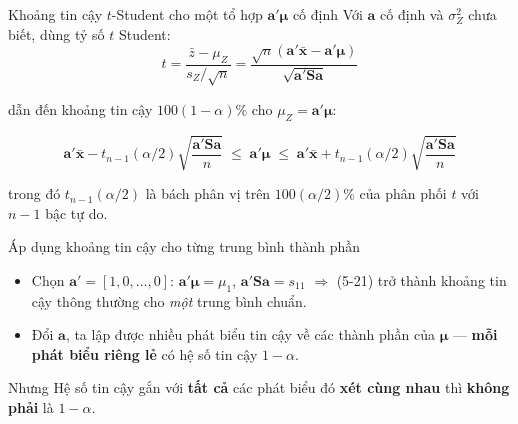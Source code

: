 \begin{frame}{Khoảng tin cậy $t$-Student cho một tổ hợp $\mathbf{a}'\boldsymbol{\mu}$ cố định}
Với $\mathbf a$ cố định và $\sigma_Z^2$ chưa biết, dùng tỷ số $t$ Student:
\[
t=\frac{\bar z-\mu_Z}{s_Z/\sqrt n}=\frac{\sqrt n(\mathbf a'\bar{\mathbf x}-\mathbf a'\boldsymbol\mu)}{\sqrt{\mathbf a'\mathbf S\mathbf a}}
\tag{5-20}
\]
 
dẫn đến khoảng tin cậy $100(1-\alpha)\%$ cho $\mu_Z=\mathbf a'\boldsymbol\mu$:
 
\[
\mathbf a'\bar{\mathbf x}-t_{n-1}(\alpha/2)\sqrt{\frac{\mathbf a'\mathbf S\mathbf a}{n}}
\;\le\; \mathbf a'\boldsymbol\mu \;\le\;
\mathbf a'\bar{\mathbf x}+t_{n-1}(\alpha/2)\sqrt{\frac{\mathbf a'\mathbf S\mathbf a}{n}}
\tag{5-21}
\]
 
trong đó $t_{n-1}(\alpha/2)$ là bách phân vị trên $100(\alpha/2)\%$ của phân
phối $t$ với $n-1$ bậc tự do.
\end{frame}
 
\begin{frame}{Áp dụng khoảng tin cậy cho từng trung bình thành phần}
\begin{itemize}
  \item Chọn $\mathbf a'=[1,0,\ldots,0]$: $\mathbf a'\boldsymbol\mu=\mu_1$,
        $\mathbf a'\mathbf S\mathbf a=s_{11}$ $\Rightarrow$ (5-21) trở thành
        khoảng tin cậy thông thường cho \emph{một} trung bình chuẩn.
  \item Đổi $\mathbf a$, ta lập được nhiều phát biểu tin cậy về các thành
        phần của $\boldsymbol\mu$ — \textbf{mỗi phát biểu riêng lẻ} có hệ số
        tin cậy $1-\alpha$.
\end{itemize}
 
\vspace{0.5em}
\begin{block}{Nhưng}
Hệ số tin cậy gắn với \textbf{tất cả} các phát biểu đó \textbf{xét cùng nhau}
thì \textbf{không phải} là $1-\alpha$.
\end{block}
\end{frame}
 
